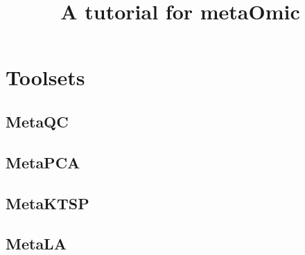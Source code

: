 \documentclass{article}
\title{A tutorial for metaOmic}
\author{}
\date{ }
\begin{document}
 
\maketitle
 
\tableofcontents
 
 
 
 
 
\section{Toolsets}
\subsection{MetaQC}

 
 
 


\subsection{MetaPCA}
\subsection{MetaKTSP}
 
\subsection{MetaLA}



 
\end{document}

